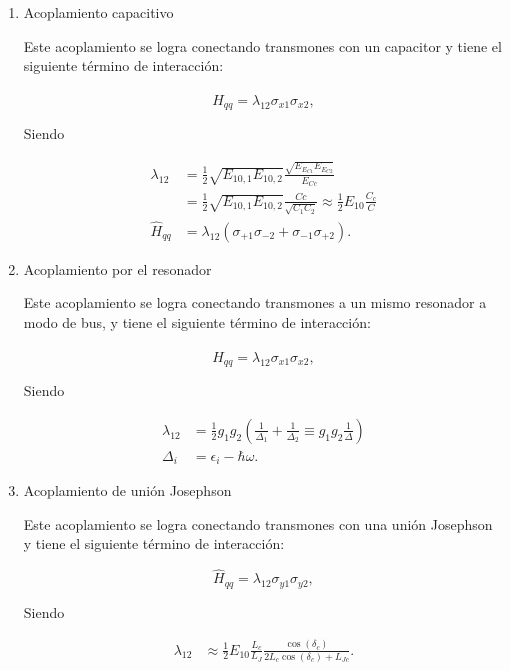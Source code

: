 \begin{enumerate}
    \item Acoplamiento capacitivo

        Este acoplamiento se logra conectando transmones con un capacitor y tiene el siguiente término de interacción:

        \begin{equation}
            \hat{H}_{qq} = \lambda_{1 2} \sigma_{x1} \sigma_{x2} ,
        \end{equation}

        Siendo

        \begin{align}
            \lambda_{1 2} &= \frac{1}{2} \sqrt{E_{1 0, 1} E_{1 0, 2}} \frac{\sqrt{E_{E_{C1}} E_{E_{C2}}}}{E_{Cc}} \\
                          &= \frac{1}{2} \sqrt{E_{1 0, 1} E_{1 0, 2}} \frac{Cc}{\sqrt{C_1 C_2}} \approx \frac{1}{2} E_{1 0} \frac{C_c}{C} \\
            \hat{H}_{qq} &= \lambda_{1 2} (\sigma_{+1} \sigma_{-2}  + \sigma_{-1} \sigma_{+2}) .
        \end{align}

    \item Acoplamiento por el resonador

        Este acoplamiento se logra conectando transmones a un mismo resonador a modo de bus, y tiene el siguiente término de interacción:

        \begin{equation}
            \hat{H}_{qq} = \lambda_{1 2} \sigma_{x1} \sigma_{x2} ,
        \end{equation}

        Siendo

        \begin{align}
            \lambda_{1 2} &= \frac{1}{2} g_1 g_2 (\frac{1}{\Delta_1} + \frac{1}{\Delta_2} \equiv g_1 g_2 \frac{1}{\Delta}) \\
            \Delta_i &= \epsilon_i - \hbar \omega .
        \end{align}

    \item Acoplamiento de unión Josephson

        Este acoplamiento se logra conectando transmones con una unión Josephson y tiene el siguiente término de interacción:

        \begin{equation}
            \hat{H}_{qq} = \lambda_{1 2} \sigma_{y1} \sigma_{y2} ,
        \end{equation}

        Siendo

        \begin{align}
            \lambda_{1 2} &\approx \frac{1}{2} E_{1 0} \frac{L_c}{L_J} \frac{\cos(\delta_c)}{2L_c \cos(\delta_c) + L_{J c}} .
        \end{align}
\end{enumerate}

